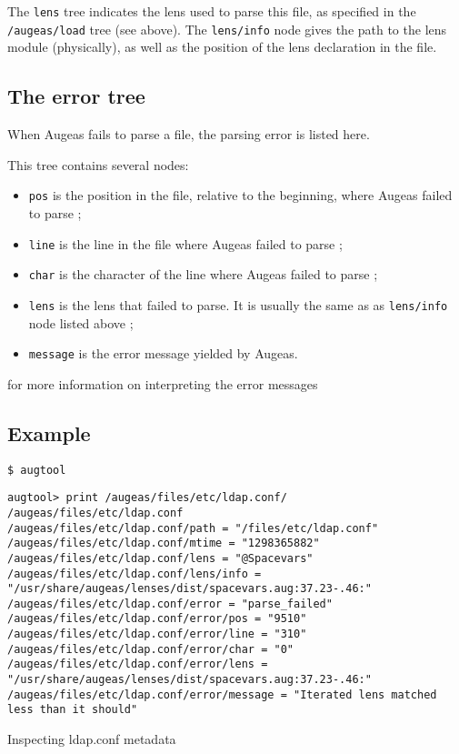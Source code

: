 The \verb!lens! tree indicates the lens used to parse this file, as specified in the \verb!/augeas/load! tree (see above). The \verb!lens/info! node gives the path to the lens module (physically), as well as the position of the lens declaration in the file.

\subsection{The error tree}

When Augeas fails to parse a file, the parsing error is listed here.

This tree contains several nodes:

\begin{itemize}
\item
  \verb!pos! is the position in the file, relative to the beginning, where Augeas failed to parse ;
\item
  \verb!line! is the line in the file where Augeas failed to parse ;
\item
  \verb!char! is the character of the line where Augeas failed to parse ;
\item
  \verb!lens! is the lens that failed to parse. It is usually the same as as \verb!lens/info! node listed above ;
\item
  \verb!message! is the error message yielded by Augeas.
\end{itemize}

 for more information on interpreting the error messages


\subsection{Example}

\begin{listing}
  \begin{verbatim}
$ augtool 
  \end{verbatim}
  \begin{verbatim}
augtool> print /augeas/files/etc/ldap.conf/
/augeas/files/etc/ldap.conf
/augeas/files/etc/ldap.conf/path = "/files/etc/ldap.conf"
/augeas/files/etc/ldap.conf/mtime = "1298365882"
/augeas/files/etc/ldap.conf/lens = "@Spacevars"
/augeas/files/etc/ldap.conf/lens/info = "/usr/share/augeas/lenses/dist/spacevars.aug:37.23-.46:"
/augeas/files/etc/ldap.conf/error = "parse_failed"
/augeas/files/etc/ldap.conf/error/pos = "9510"
/augeas/files/etc/ldap.conf/error/line = "310"
/augeas/files/etc/ldap.conf/error/char = "0"
/augeas/files/etc/ldap.conf/error/lens = "/usr/share/augeas/lenses/dist/spacevars.aug:37.23-.46:"
/augeas/files/etc/ldap.conf/error/message = "Iterated lens matched less than it should"
  \end{verbatim}
  \caption{Inspecting ldap.conf metadata}
  \label{lst:metadata_ldap_conf}
\end{listing}

